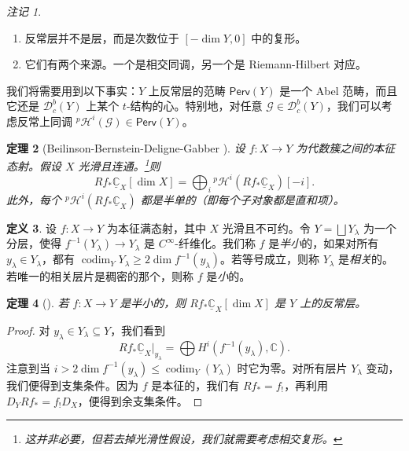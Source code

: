 \documentclass{amsart}
\newtheorem{thm}{定理}[section]
\theoremstyle{definition}
\newtheorem{defn}[thm]{定义}
\theoremstyle{remark}
\newtheorem{rmks}[thm]{注记}
\theoremstyle{plain}
\theoremstyle{definition}
\theoremstyle{remark}
\newcommand{\C}{\mathbb{C}}
\newcommand{\mc}[1]{\mathcal{#1}}
\newcommand{\on}[1]{\operatorname{#1}}
\newcommand{\ms}[1]{\mathsf{#1}}
\newcommand{\ul}[1]{\underline{#1}}
\newcommand{\1}{\mathbf{1}}
\newcommand{\2}{\mathbf{2}}
\newcommand{\3}{\mathbf{3}}
\begin{document}
\begin{rmks}\leavevmode
    \begin{enumerate}
        \item 反常层并不是层，而是次数位于 \([-\dim Y, 0]\) 中的复形。
        \item 它们有两个来源。一个是相交同调，另一个是 Riemann-Hilbert 对应。
    \end{enumerate}
\end{rmks}

我们将需要用到以下事实：\(Y\) 上反常层的范畴 \(\ms{Perv}(Y)\) 是一个 Abel 范畴，而且它还是 \(\mc{D}_c^b(Y)\) 上某个 \(t\)-结构的心。特别地，对任意 \(\mc{G} \in \mc{D}_c^b (Y)\)，我们可以考虑反常上同调 \(^p\mc{H}^i(\mc{G}) \in \ms{Perv}(Y)\)。

\begin{thm}[Beilinson-Bernstein-Deligne-Gabber {\cite{BBD1982}}]
    设 \(f \colon X \to Y\) 为代数簇之间的本征态射。假设 \(X\) 光滑且连通。\footnote{这并非必要，但若去掉光滑性假设，我们就需要考虑相交复形。}则
    \[ R f_* \ul{\C}_X [\dim X] = \bigoplus_{i} {^p\mc{H}^i}(R f_* \ul{\C}_X)[-i]. \]
    此外，每个 \(^p\mc{H}^i (R f_* \ul{\C}_X)\) 都是半单的（即每个子对象都是直和项）。
\end{thm}

\begin{defn}
    设 \(f \colon X \to Y\) 为本征满态射，其中 \(X\) 光滑且不可约。令 \(Y = \bigsqcup Y_{\lambda}\) 为一个分层，使得 \(f^{-1}(Y_{\lambda}) \to Y_{\lambda}\) 是 \(C^{\infty}\)-纤维化。我们称 \(f\) 是\textit{半小}的，如果对所有 \(y_{\lambda} \in Y_{\lambda}\)，都有 \(\on{codim}_Y Y_{\lambda} \geq 2 \dim f^{-1} (y_{\lambda})\)。若等号成立，则称 \(Y_{\lambda}\) 是\textit{相关}的。若唯一的相关层片是稠密的那个，则称 \(f\) 是\textit{小}的。
\end{defn}

\begin{thm}[{\cite{DeCataldoMigliorini2002}}]
    若 \(f \colon X \to Y\) 是半小的，则 \(R f_* \ul{\C}_X [\dim X]\) 是 \(Y\) 上的反常层。
\end{thm}

\begin{proof}
    对 \(y_{\lambda} \in Y_{\lambda} \subseteq Y\)，我们看到
    \[ R f_* \ul{\C}_X |_{y_{\lambda}} = \bigoplus H^i (f^{-1}(y_{\lambda}), \C). \]
    注意到当 \(i > 2 \dim f^{-1}(y_{\lambda}) \leq \on{codim}_Y (Y_{\lambda})\) 时它为零。对所有层片 \(Y_{\lambda}\) 变动，我们便得到支集条件。因为 \(f\) 是本征的，我们有 \(R f_* = f_!\)，再利用 \(D_Y R f_* = f_! D_X\)，便得到余支集条件。
\end{proof}
\end{document}
